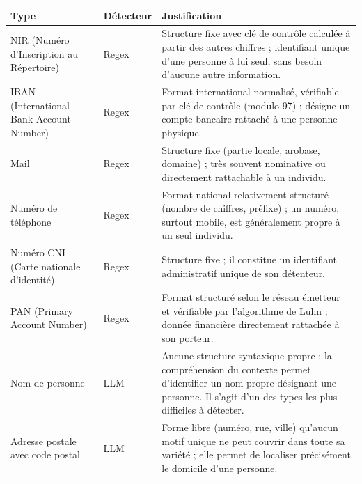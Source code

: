 \documentclass[12pt,a4paper]{article}
\begin{document}
\renewcommand{\arraystretch}{1.3}
\begin{longtable}{
    p{3.2cm}
    @{\hspace{0.4cm}}
    p{1.8cm}
    @{\hspace{0.4cm}}
    p{8.5cm}
}
\toprule
\textbf{Type} & \textbf{Détecteur} & \textbf{Justification} \\
\midrule
\endhead

NIR (Numéro d’Inscription au Répertoire)
& Regex
& Structure fixe avec clé de contrôle calculée à partir des autres chiffres ;
identifiant unique d'une personne à lui seul, sans besoin d'aucune autre
information. \\

IBAN (International Bank Account Number)
& Regex
& Format international normalisé, vérifiable par clé de contrôle
(modulo 97) ; désigne un compte bancaire rattaché à une personne physique. \\

Mail
& Regex
& Structure fixe (partie locale, arobase, domaine) ; très souvent nominative
ou directement rattachable à un individu. \\

Numéro de téléphone
& Regex
& Format national relativement structuré (nombre de chiffres, préfixe) ;
un numéro, surtout mobile, est généralement propre à un seul individu. \\

Numéro CNI (Carte nationale d'identité)
& Regex
& Structure fixe ; il constitue un identifiant administratif unique de son
détenteur. \\

PAN (Primary Account Number)
& Regex
& Format structuré selon le réseau émetteur et vérifiable par l'algorithme
de Luhn ; donnée financière directement rattachée à son porteur. \\

Nom de personne
& LLM
& Aucune structure syntaxique propre ; la compréhension du contexte permet
d'identifier un nom propre désignant une personne. Il s'agit d'un des types
les plus difficiles à détecter. \\

Adresse postale avec code postal
& LLM
& Forme libre (numéro, rue, ville) qu'aucun motif unique ne peut couvrir dans
toute sa variété ; elle permet de localiser précisément le domicile d'une
personne. \\

\bottomrule
\end{longtable}
\end{document}
